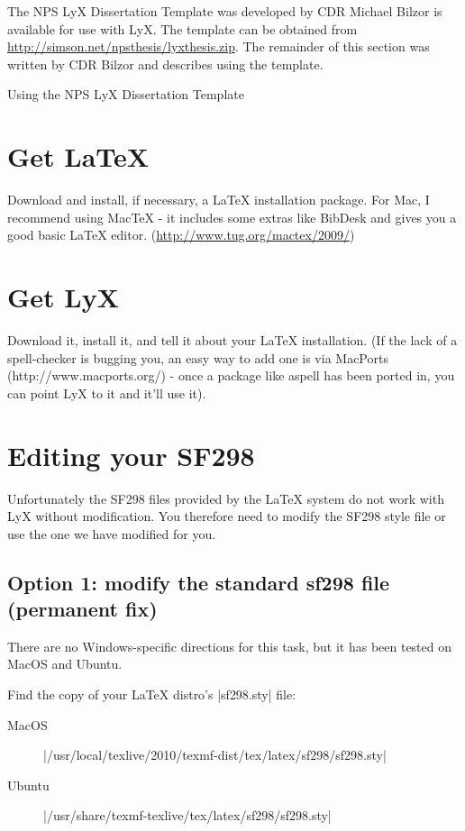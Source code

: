 The NPS LyX Dissertation Template was developed by CDR Michael
Bilzor is available for use with LyX. The template can be obtained from
\url{http://simson.net/npsthesis/lyxthesis.zip}.   The remainder of
this section was written by CDR Bilzor and describes using the
template.

Using the NPS LyX Dissertation Template

\section*{Get \LaTeX}
Download and install, if necessary, a \LaTeX{} installation package. For
Mac, I recommend using Mac\TeX{} - it includes some extras like BibDesk
and gives you a good basic \LaTeX{} 
editor. (\url{http://www.tug.org/mactex/2009/})

\section*{Get LyX}
Download it, install it, and tell it about your \LaTeX{}
  installation. (If the lack of a spell-checker is bugging you, an
  easy way to add one is via MacPorts (http://www.macports.org/) -
  once a package like aspell has been ported in, you can point LyX to
  it and it'll use it).

\section*{Editing your SF298}

Unfortunately the SF298 files provided by the \LaTeX{} system do not
work with LyX without modification. You therefore need to modify the
SF298 style file or use the one we have modified for you.

\subsection*{Option 1: modify the standard sf298 file (permanent fix)}

There are no Windows-specific directions for this task, but it has
been tested on MacOS and Ubuntu.

Find the copy of your \LaTeX{} distro's |sf298.sty| file:

\begin{description}
\item[MacOS]  	|/usr/local/texlive/2010/texmf-dist/tex/latex/sf298/sf298.sty|
\item[Ubuntu]   |/usr/share/texmf-texlive/tex/latex/sf298/sf298.sty|
\end{description}

